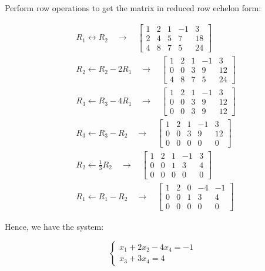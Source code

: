 \documentclass{article}
\begin{document}
Perform row operations to get the matrix in reduced row echelon form:

\begin{align*}
& R_1 \leftrightarrow R_2 
\quad \longrightarrow 
\quad
\left[
\begin{array}{cccc|c}
1 & 2 & 1 & -1 & 3 \\
2 & 4 & 5 & 7 & 18 \\
4 & 8 & 7 & 5 & 24
\end{array}
\right] \\
& R_2 \leftarrow R_2 - 2R_1 
\quad \longrightarrow
\quad
\left[
\begin{array}{cccc|c}
1 & 2 & 1 & -1 & 3 \\
0 & 0 & 3 & 9 & 12 \\
4 & 8 & 7 & 5 & 24
\end{array}
\right] \\
& R_3 \leftarrow R_3 - 4R_1 
\quad \longrightarrow
\quad
\left[
\begin{array}{cccc|c}
1 & 2 & 1 & -1 & 3 \\
0 & 0 & 3 & 9 & 12 \\
0 & 0 & 3 & 9 & 12
\end{array}
\right] \\
& R_3 \leftarrow R_3 - R_2 
\quad \longrightarrow
\quad
\left[
\begin{array}{cccc|c}
1 & 2 & 1 & -1 & 3 \\
0 & 0 & 3 & 9 & 12 \\
0 & 0 & 0 & 0 & 0
\end{array}
\right] \\
& R_2 \leftarrow \frac{1}{3} R_2 
\quad \longrightarrow
\quad
\left[
\begin{array}{cccc|c}
1 & 2 & 1 & -1 & 3 \\
0 & 0 & 1 & 3 & 4 \\
0 & 0 & 0 & 0 & 0
\end{array}
\right] \\
& R_1 \leftarrow R_1 - R_2
\quad \longrightarrow
\quad
\left[
\begin{array}{cccc|c}
1 & 2 & 0 & -4 & -1 \\
0 & 0 & 1 & 3 & 4 \\
0 & 0 & 0 & 0 & 0
\end{array}
\right]
\end{align*}

Hence, we have the system:

\[
\begin{cases}
x_1 + 2x_2 - 4x_4 = -1 \\
x_3 + 3x_4 = 4
\end{cases}
\]
\end{document}
